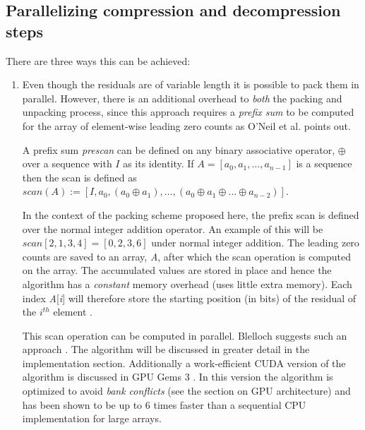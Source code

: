 \subsection{Parallelizing compression and decompression steps}
There are three ways this can be achieved: 
\begin{enumerate}
 \item Even though the residuals are of variable length it is possible to pack them in parallel. However, there is an additional overhead to \textit{both} the packing and 
 unpacking process, since this approach requires a \textit{prefix sum} to be computed for the array of element-wise leading zero counts as O'Neil et al. \cite{O'Neil:2011:FDC:1964179.1964189} 
 points out.
 
 A prefix sum \textit{prescan} can be defined on any binary associative operator, $\oplus$ over a sequence with $I$ as its identity. If $A=[a_{0},a_{1},\dots,a_{n-1}]$ 
 is a sequence then the scan is defined as $scan(A):=[I,a_{0},(a_{0} \oplus a_{1}),\dots,(a_{0} \oplus a_{1} \oplus ... \oplus a_{n-2})]$.
 
 In the context of the packing scheme proposed here, the prefix scan is defined over the normal integer addition operator. An example of this will be $scan[2,1,3,4] = [0,2,3,6]$ 
 under normal integer addition. The leading zero counts are saved to an array, \textit{A}, after which the scan operation is computed on the array. The accumulated values are 
 stored in place and hence the algorithm has a \textit{constant} memory overhead (uses little extra memory). Each index \textit{A}[\textit{i}] will therefore store the starting 
 position (in bits) of the residual of the $i^{th}$ element \cite{blelloch1990prefix}. 

 This scan operation can be computed in parallel. Blelloch suggests such an approach \cite{blelloch1990prefix}. The algorithm will be discussed in greater detail in the 
 implementation section. Additionally a work-efficient CUDA version of the algorithm is discussed in GPU Gems 3 \cite{harris2007parallel}. In this version the algorithm is 
 optimized to avoid \textit{bank conflicts} (see the section on GPU architecture) and has been shown to be up to 6 times faster than a sequential CPU implementation for large 
 arrays.
 

\end{enumerate}
